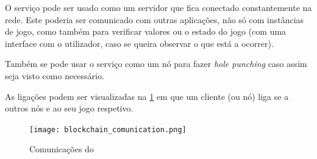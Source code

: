 O serviço pode ser usado como um servidor que fica conectado constantemente na rede. Este poderia ser comunicado com outras aplicações, não só com instâncias de jogo, como também para verificar valores ou o estado do jogo (com uma interface com o utilizador, caso se queira observar o que está a ocorrer).

Também se pode usar o serviço como um nó para fazer \textit{hole punching} caso assim seja visto como necessário.

As ligações podem ser visualizadas na \cref{fig:gamechaining_coms} em que um cliente (ou nó) liga se a outros nós e ao seu jogo respetivo.

\begin{figure}[!ht]
      \centering
      \texttt{[image: blockchain\_comunication.png]}
      \caption{Comunicações do \gamechaining{}}
      \label{fig:gamechaining_coms}
\end{figure}
